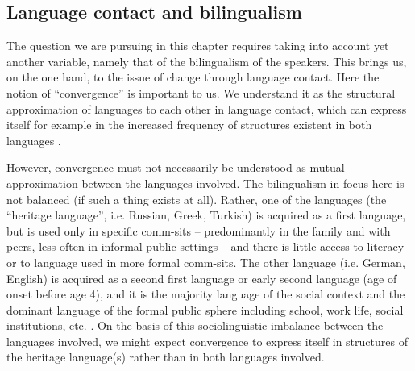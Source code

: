\documentclass[output=paper,colorlinks,citecolor=brown]{langscibook}
\begin{document}
\subsection{Language contact and bilingualism} \label{sec:schroederetal:1.5}

The question we are pursuing in this chapter requires taking into account yet another variable, namely that of the bilingualism of the speakers. This brings us, on the one hand, to the issue of change through language contact. Here the notion of “convergence” is important to us. We understand it as the structural approximation of languages to each other in language contact, which can express itself for example in the increased frequency of structures existent in both languages \parencite{matras2009,matras2020language,grant2020contact}.

However, convergence must not necessarily be understood as mutual approximation between the languages involved. The bilingualism in focus here is not balanced (if such a thing exists at all). Rather, one of the languages (the “heritage language”, i.e. Russian, Greek, Turkish) is acquired as a first language, but is used only in specific comm-sits – predominantly in the family and with peers, less often in informal public settings – and there is little access to literacy or to language used in more formal comm-sits. The other language (i.e. German, English) is acquired as a second first language or early second language (age of onset before age 4), and it is the majority language of the social context and the dominant language of the formal public sphere including school, work life, social institutions, etc. \parencite{maas2008sprache}. On the basis of this sociolinguistic imbalance between the languages involved, we might expect convergence to express itself in structures of the heritage language(s) rather than in both languages involved.
\end{document}
